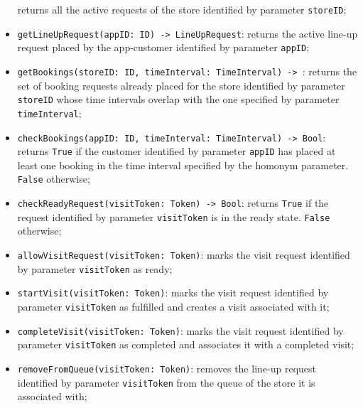 \documentclass[a4paper,oneside,11pt]{book}
\newcommand{\red}[1]{\begingroup\color{punct}#1\endgroup}
\begin{document}
\begin{itemize}
       returns all the active requests of the store identified by parameter \texttt{storeID};
       \item \texttt{getLineUpRequest(appID: \red{ID}) -> \red{LineUpRequest}}: \newline
       returns the active line-up request placed by the app-customer identified by parameter \texttt{appID};
       \item \texttt{getBookings(storeID: \red{ID}, timeInterval: \red{TimeInterval}) -> \newline [\red{BookingRequest}]}: \newline
       returns the set of booking requests already placed for the store identified by parameter \texttt{storeID} whose time intervals overlap with the one specified by parameter \texttt{timeInterval};
       \item \texttt{checkBookings(appID: \red{ID}, timeInterval: \red{TimeInterval}) -> \red{Bool}}: \newline
       returns \texttt{True} if the customer identified by parameter \texttt{appID} has placed at least one booking in the time interval specified by the homonym parameter. \texttt{False} otherwise;
       \item \texttt{checkReadyRequest(visitToken: \red{Token}) -> \red{Bool}}: \newline
       returns \texttt{True} if the request identified by parameter \texttt{visitToken} is in the ready state. \texttt{False} otherwise;
       \item \texttt{allowVisitRequest(visitToken: \red{Token})}: \newline
       marks the visit request identified by parameter \texttt{visitToken} as ready;
       \item \texttt{startVisit(visitToken: \red{Token})}: \newline
       marks the visit request identified by parameter \texttt{visitToken} as fulfilled and creates a visit associated with it;
       \item \texttt{completeVisit(visitToken: \red{Token})}: \newline
       marks the visit request identified by parameter \texttt{visitToken} as completed and associates it with a completed visit;
       \item \texttt{removeFromQueue(visitToken: \red{Token})}: \newline
       removes the line-up request identified by parameter \texttt{visitToken} from the queue of the store it is associated with;

\end{itemize}
\end{document}
